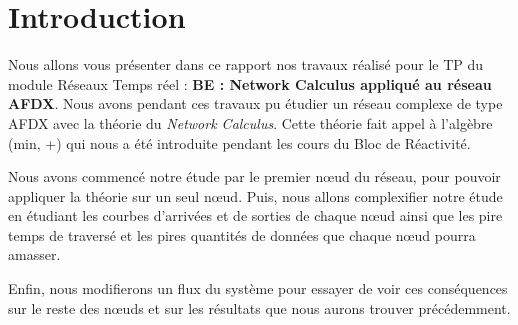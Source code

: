 \chapter*{Introduction}
\label{chap:Intro}

Nous allons vous présenter dans ce rapport nos travaux réalisé pour le TP du module Réseaux Temps réel : \textbf{BE : Network Calculus appliqué au réseau AFDX}. Nous avons pendant ces travaux pu étudier un réseau complexe de type AFDX avec la théorie du \emph{Network Calculus}. Cette théorie fait appel à l'algèbre (min, +) qui nous a été introduite pendant les cours du Bloc de Réactivité.

Nous avons commencé notre étude par le premier nœud du réseau, pour pouvoir appliquer la théorie sur un seul nœud. Puis, nous allons complexifier notre étude en étudiant les courbes d'arrivées et de sorties de chaque nœud ainsi que les pire temps de traversé et les pires quantités de données que chaque nœud pourra amasser.

Enfin, nous modifierons un flux du système pour essayer de voir ces conséquences sur le reste des nœuds et sur les résultats que nous aurons trouver précédemment.